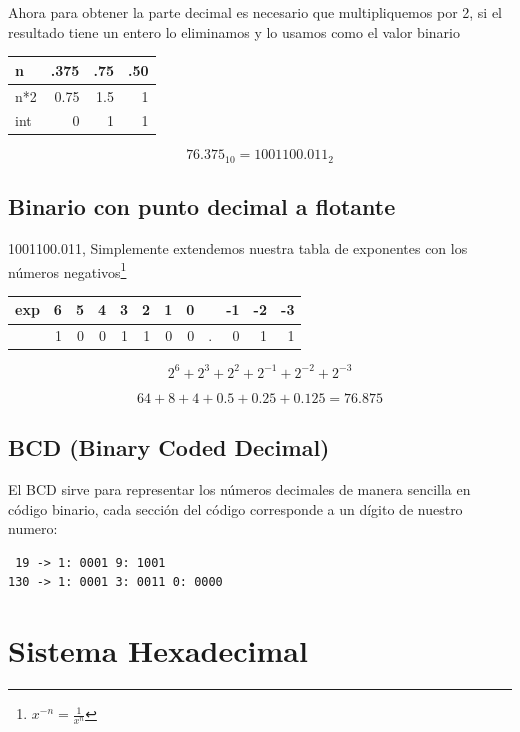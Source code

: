 \documentclass[11pt]{article}
\begin{document}
Ahora para obtener la parte decimal es necesario que multipliquemos por 2, si el resultado tiene un entero lo eliminamos y lo usamos como el valor binario

\begin{center}
\begin{tabular}{|l|r|r|r|}
\hline
n & .375 & .75 & .50\\
\hline
n*2 & 0.75 & 1.5 & 1\\
int & 0 & 1 & 1\\
\hline
\end{tabular}
\end{center}

\[76.375_{10} = 1001100.011_2\]

\subsection{Binario con punto decimal a flotante}
\label{sec:orge3d9823}
1001100.011, Simplemente extendemos nuestra tabla de exponentes con los números negativos\footnote{\(x^{-n} = \frac{1}{x^n}\)}

\begin{center}
\begin{tabular}{|l|r|r|r|r|r|r|r|l|r|r|r|}
\hline
exp & 6 & 5 & 4 & 3 & 2 & 1 & 0 &  & -1 & -2 & -3\\
\hline
 & 1 & 0 & 0 & 1 & 1 & 0 & 0 & . & 0 & 1 & 1\\
\hline
\end{tabular}
\end{center}

\[
2^{6} + 2^{3} + 2^{2} + 2^{-1} + 2^{-2} + 2^{-3}
\]

\[
64 + 8 + 4 + 0.5 + 0.25 + 0.125 = \boxed{76.875}
\]

\subsection{BCD (Binary Coded Decimal)}
\label{sec:org7e12fca}
El BCD sirve para representar los números decimales de manera sencilla en código binario, cada sección del código corresponde a un dígito de nuestro numero:

\begin{verbatim}
 19 -> 1: 0001 9: 1001
130 -> 1: 0001 3: 0011 0: 0000
\end{verbatim}

\section{Sistema Hexadecimal}
\label{sec:orgda8f093}
\end{document}
